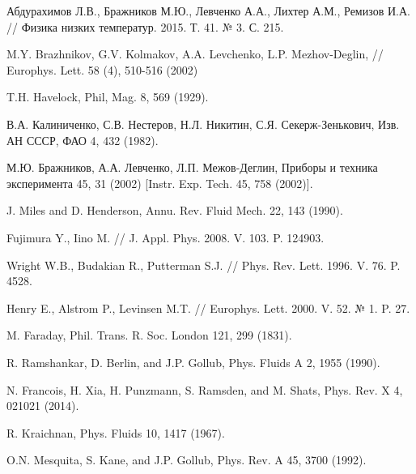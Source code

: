 \begin{thebibliography}{99}
Абдурахимов Л.В., Бражников М.Ю., Левченко А.А., Лихтер А.М., Ремизов И.А. // Физика низких температур. 2015. Т. 41. № 3. С. 215.


M.Y. Brazhnikov, G.V. Kolmakov, A.A. Levchenko, L.P. Mezhov-Deglin, 
// Europhys. Lett. 58 (4), 510-516 (2002)


T.H. Havelock, Phil, Mag. 8, 569 (1929).

В.А. Калиниченко, С.В. Нестеров, Н.Л. Никитин, С.Я. Секерж-Зенькович, Изв. АН СССР, ФАО 4, 432 (1982).

М.Ю. Бражников, А.А. Левченко, Л.П. Межов-Деглин, Приборы и техника эксперимента 45, 31 (2002) [Instr. Exp. Tech. 45, 758 (2002)].

J. Miles and D. Henderson, Annu. Rev. Fluid Mech. 22, 143 (1990).

Fujimura Y., Iino M. // J. Appl. Phys. 2008. V. 103. P. 124903.

Wright W.B., Budakian R., Putterman S.J. // Phys. Rev. Lett. 1996. V. 76. P. 4528.

Henry E., Alstrom P., Levinsen M.T. // Europhys. Lett. 2000. V. 52. № 1. P. 27.




M. Faraday, Phil. Trans. R. Soc. London 121, 299 (1831).

R. Ramshankar, D. Berlin, and J.P. Gollub, Phys. Fluids A 2, 1955 (1990).


N. Francois, H. Xia, H. Punzmann, S. Ramsden, and M. Shats, Phys. Rev. X 4, 021021 (2014).

R. Kraichnan, Phys. Fluids 10, 1417 (1967).

O.N. Mesquita, S. Kane, and J.P. Gollub, Phys. Rev. A 45, 3700 (1992).


\end{thebibliography}
